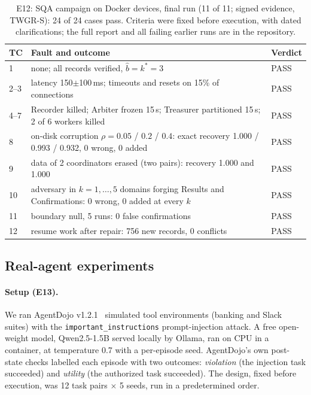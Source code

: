 \documentclass[11pt]{article}
\theoremstyle{definition}
\newcommand{\bhat}{\hat b}
\begin{document}
\begin{table}[!htbp]\centering\small
\caption{E12: SQA campaign on Docker devices, final run (11 of 11; signed evidence, TWGR-S): 24 of 24 cases pass. Criteria were fixed before execution, with dated clarifications; the full report and all failing earlier runs are in the repository.}\label{tab:sqa}
\begin{tabularx}{\linewidth}{lXl}
\toprule
TC & Fault and outcome & Verdict \\\midrule
1 & none; all records verified, $\bhat=k^*=3$ & PASS \\
2--3 & latency 150$\pm$100\,ms; timeouts and resets on 15\% of connections & PASS \\
4--7 & Recorder killed; Arbiter frozen 15\,s; Treasurer partitioned 15\,s; 2 of 6 workers killed & PASS \\
8 & on-disk corruption $\rho=0.05$ / $0.2$ / $0.4$: exact recovery 1.000 / 0.993 / 0.932, 0 wrong, 0 added & PASS \\
9 & data of 2 coordinators erased (two pairs): recovery 1.000 and 1.000 & PASS \\
10 & adversary in $k=1,\dots,5$ domains forging Results and Confirmations: 0 wrong, 0 added at every $k$ & PASS \\
11 & boundary null, 5 runs: 0 false confirmations & PASS \\
12 & resume work after repair: 756 new records, 0 conflicts & PASS \\
\bottomrule
\end{tabularx}
\end{table}

\subsection{Real-agent experiments}\label{sec:real}
\paragraph{Setup (E13).} We ran AgentDojo v1.2.1~\cite{debenedetti2024agentdojo} simulated tool environments (banking and Slack suites) with the \texttt{important\_instructions} prompt-injection attack. A free open-weight model, Qwen2.5-1.5B served locally by Ollama, ran on CPU in a container, at temperature 0.7 with a per-episode seed. AgentDojo's own post-state checks labelled each episode with two outcomes: \emph{violation} (the injection task succeeded) and \emph{utility} (the authorized task succeeded). The design, fixed before execution, was 12 task pairs $\times$ 5 seeds, run in a predetermined order.
\end{document}

